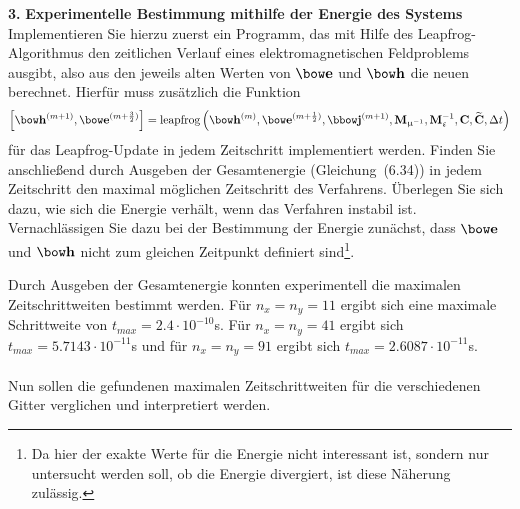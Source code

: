 \documentclass[Protokollheft.tex]{subfiles}
\begin{document}
\begin{framed}
	\noindent \textbf{3.} \textbf{Experimentelle Bestimmung mithilfe der Energie des Systems}\\
Implementieren Sie hierzu zuerst ein Programm, das mit Hilfe des Leapfrog-Algorithmus den
zeitlichen Verlauf eines elektromagnetischen Feldproblems ausgibt,
also aus den jeweils alten Werten von $\efit$ und $\hfit$ die neuen
berechnet. Hierfür muss zusätzlich die Funktion
\begin{align}
    \left[\hfit^{(m+1)},\efit^{(m+\frac{3}{2})}\right]= {\text{leapfrog}}
	\left(\hfit^{(m)},\efit^{(m+\frac{1}{2})},\jfit^{(m+1)},\Mmui,\Meps^{-1},\curlfit,\curldfit,\Delta t \right)
\end{align}
für das Leapfrog-Update in jedem Zeitschritt implementiert werden.
Finden Sie anschließend durch Ausgeben der Gesamtenergie (Gleichung~(6.34))
in jedem Zeitschritt den maximal möglichen Zeitschritt des Verfahrens.
Überlegen Sie sich dazu, wie sich die Energie verhält, wenn das Verfahren instabil ist.
Vernachlässigen Sie dazu bei der Bestimmung der Energie zunächst, dass $\efit$
und $\hfit$ nicht zum gleichen Zeitpunkt definiert sind\footnote{Da
hier der exakte Werte für die Energie nicht interessant ist,
sondern nur untersucht werden soll, ob die Energie divergiert, ist
diese Näherung zulässig.}.\label{exer:calcDeltaTmaxWithEnergy}
\end{framed}
\noindent
Durch Ausgeben der Gesamtenergie konnten experimentell die maximalen Zeitschrittweiten bestimmt werden. Für $n_x=n_y =11$ ergibt sich eine maximale Schrittweite von $t_{max}=2.4\cdot 10^{-10}$s. Für $n_x=n_y =41$ ergibt sich $t_{max}=5.7143\cdot 10^{-11}$s und für $n_x=n_y =91$ ergibt sich $t_{max}=2.6087\cdot 10^{-11}$s.\\
\\
\noindent Nun sollen die gefundenen maximalen Zeitschrittweiten für die verschiedenen Gitter verglichen und interpretiert werden.
\end{document}

